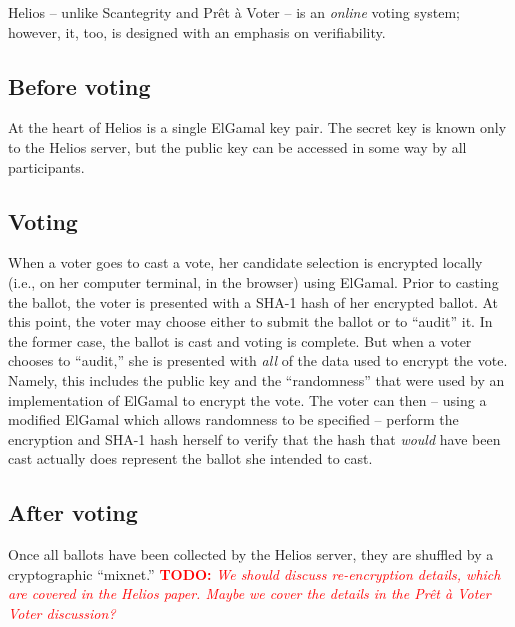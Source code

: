 \documentclass[10pt,twocolumn]{article}
\newcommand{\todo}[1]{\textcolor{red}{\textbf{TODO:} \emph{#1}}}
\newcommand{\preta}{Pr\^{e}t \`{a}}
\newcommand{\pv}{\preta{} Voter}
\begin{document}
Helios \cite{helios} -- unlike Scantegrity and \pv{} -- is an \emph{online} voting
system; however, it, too, is designed with an emphasis on verifiability.

\subsection{Before voting}

At the heart of Helios is a single ElGamal key pair. The secret key is known only to the Helios
server, but the public key can be accessed in some way by all participants.

\subsection{Voting}

When a voter goes to cast a vote, her candidate selection is encrypted locally (i.e., on her
computer terminal, in the browser) using ElGamal. Prior to casting the ballot, the voter is
presented with a SHA-1 hash of her encrypted ballot. At this point, the voter may choose either
to submit the ballot or to ``audit'' it. In the former case, the ballot is cast and voting is
complete. But when a voter chooses to ``audit,'' she is presented with \emph{all} of the data
used to encrypt the vote. Namely, this includes the public key and the ``randomness'' that were used
by an implementation of ElGamal to encrypt the vote. The voter can then -- using a modified ElGamal
which allows randomness to be specified -- perform the encryption and SHA-1 hash herself
to verify that the hash that \emph{would} have been cast actually does represent the ballot she
intended to cast.

\subsection{After voting}

Once all ballots have been collected by the Helios server, they are shuffled by a cryptographic
``mixnet.'' \todo{We should discuss re-encryption details, which are covered in the Helios paper.
Maybe we cover the details in the \pv{} Voter discussion?}
\end{document}
